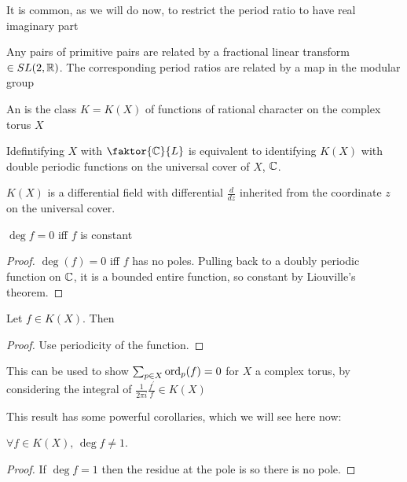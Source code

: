 \documentclass{article}
\begin{document}
It is common, as we will do now, to restrict the period ratio to have real imaginary part

\begin{prop}
	Any pairs of primitive pairs are related by a fractional linear transform $\in SL(2,\mathbb{R})$. The corresponding period ratios are related by a map in the modular group
\end{prop}

\begin{definition}
	An  is the class $K =K(X)$ of functions of rational character on the complex torus $X$
\end{definition}

\begin{remark}
	Idefintifying $X$ with $\faktor{\mbb{C}}{L}$ is equivalent to identifying $K(X)$ with double periodic functions on the universal cover of $X$, $\mathbb{C}$.
\end{remark}

\begin{prop}
	$K(X)$ is a differential field with differential $\frac{d}{dz}$ inherited from the coordinate $z$ on the universal cover.  
\end{prop}

\begin{prop}
	$\deg f = 0$ iff $f$ is constant
\end{prop}
\begin{proof}
	$\deg(f) = 0$ iff $f$ has no poles. Pulling back to a doubly periodic function on $\mathbb{C}$, it is a bounded entire function, so constant by Liouville's theorem. 
\end{proof}

\begin{lemma}
	Let $f \in K(X)$. Then 
\end{lemma}
\begin{proof}
	Use periodicity of the function. 
\end{proof}

\begin{remark}
	This can be used to show $\sum_{p\in X} \operatorname{ord}_p(f)=0$ for $X$ a complex torus, by considering the integral of $\frac{1}{2\pi i}\frac{f^\prime}{f} \in K(X)$
\end{remark}

This result has some powerful corollaries, which we will see here now:

\begin{prop}
	$\forall f \in K(X), \, \deg f \neq 1$.
\end{prop}
\begin{proof}
	If $\deg f = 1$ then the residue at the pole is 
	so there is no pole. 
\end{proof}
\end{document}
